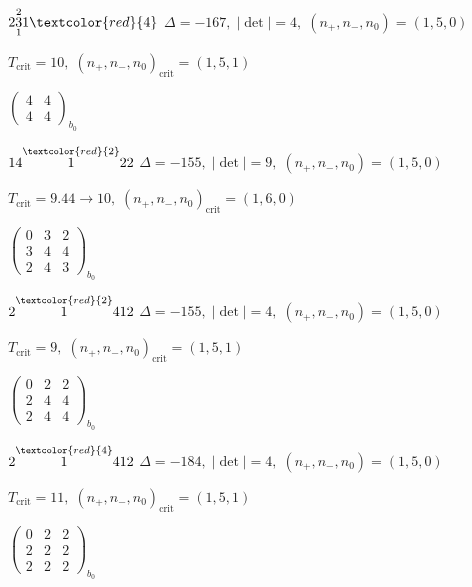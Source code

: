 \documentclass[10pt]{article}
\begin{document}
$2\overset{2}{\underset{1}{3}}1\textcolor{red}{4}$ \quad $\Delta=-167,\; |\det|=4,\; (n_+,n_-,n_0)=(1,5,0)$

\hspace{1em}$T_{\text{crit}}=10,\; (n_+,n_-,n_0)_{\text{crit}}=(1,5,1)$

\hspace{2em}$\left(\begin{smallmatrix}4 & 4 \\ 4 & 4\end{smallmatrix}\right)_{\!b_0}$

\smallskip

$14\overset{\textcolor{red}{2}}{1}22$ \quad $\Delta=-155,\; |\det|=9,\; (n_+,n_-,n_0)=(1,5,0)$

\hspace{1em}$T_{\text{crit}}=9.44 \to 10,\; (n_+,n_-,n_0)_{\text{crit}}=(1,6,0)$

\hspace{2em}$\left(\begin{smallmatrix}0 & 3 & 2 \\ 3 & 4 & 4 \\ 2 & 4 & 3\end{smallmatrix}\right)_{\!b_0}$

\smallskip

$2\overset{\textcolor{red}{2}}{1}412$ \quad $\Delta=-155,\; |\det|=4,\; (n_+,n_-,n_0)=(1,5,0)$

\hspace{1em}$T_{\text{crit}}=9,\; (n_+,n_-,n_0)_{\text{crit}}=(1,5,1)$

\hspace{2em}$\left(\begin{smallmatrix}0 & 2 & 2 \\ 2 & 4 & 4 \\ 2 & 4 & 4\end{smallmatrix}\right)_{\!b_0}$

$2\overset{\textcolor{red}{4}}{1}412$ \quad $\Delta=-184,\; |\det|=4,\; (n_+,n_-,n_0)=(1,5,0)$

\hspace{1em}$T_{\text{crit}}=11,\; (n_+,n_-,n_0)_{\text{crit}}=(1,5,1)$

\hspace{2em}$\left(\begin{smallmatrix}0 & 2 & 2 \\ 2 & 2 & 2 \\ 2 & 2 & 2\end{smallmatrix}\right)_{\!b_0}$
\end{document}
